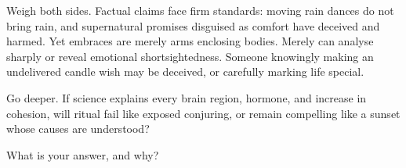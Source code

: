 Weigh both sides. Factual claims face firm standards: moving rain dances do not bring rain, and supernatural promises disguised as comfort have deceived and harmed. Yet embraces are merely arms enclosing bodies. Merely can analyse sharply or reveal emotional shortsightedness. Someone knowingly making an undelivered candle wish may be deceived, or carefully marking life special.

Go deeper. If science explains every brain region, hormone, and increase in cohesion, will ritual fail like exposed conjuring, or remain compelling like a sunset whose causes are understood?

What is your answer, and why?
